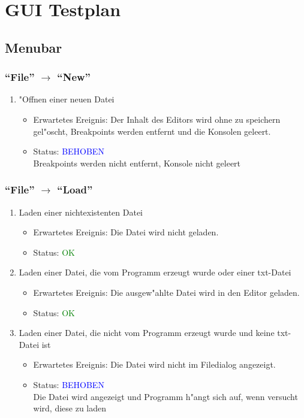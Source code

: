 \section{GUI Testplan}
\subsection{Menubar}
\subsubsection{"`File"' $\rightarrow$ "`New"'}
\begin{enumerate}
\item "Offnen einer neuen Datei
\begin{itemize}
\item Erwartetes Ereignis: Der Inhalt des Editors wird ohne zu speichern gel"oscht, Breakpoints werden entfernt und die Konsolen geleert. 
\item Status: \textcolor{blue}{BEHOBEN} \\
Breakpoints werden nicht entfernt, Konsole nicht geleert
\end{itemize}
\end{enumerate}
\subsubsection{"`File"' $\rightarrow$ "`Load"'}
\begin{enumerate}
\item Laden einer nichtexistenten Datei
\begin{itemize}
\item Erwartetes Ereignis: Die Datei wird nicht geladen. 
\item Status: \textcolor{green}{OK} 
\end{itemize}
\item Laden einer Datei, die vom Programm erzeugt wurde oder einer txt-Datei
\begin{itemize}
\item Erwartetes Ereignis: Die ausgew"ahlte Datei wird in den Editor geladen. 
\item Status: \textcolor{green}{OK}
\end{itemize}
\item Laden einer Datei, die nicht vom Programm erzeugt wurde und keine txt-Datei ist
\begin{itemize}
\item Erwartetes Ereignis: Die Datei wird nicht im Filedialog angezeigt. 
\item Status: \textcolor{blue}{BEHOBEN} \\
Die Datei wird angezeigt und Programm h"angt sich auf, wenn versucht wird, diese zu laden
\end{itemize}
\end{enumerate}
